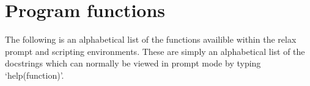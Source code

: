 \documentclass[a4paper, 12pt, twoside]{book}
\begin{document}

\chapter{Program functions}

The following is an alphabetical list of the functions availible within the relax prompt and scripting environments.  These are simply an alphabetical list of the docstrings which can normally be viewed in prompt mode by typing `help(function)'.


\end{document}

